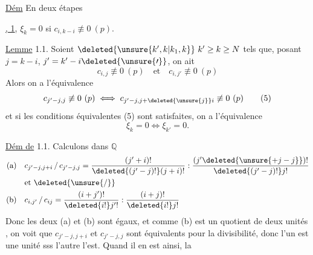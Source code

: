 \uline{Dém} En deux étapes

\uline{, 1}, $\xi_k=0$ si  $c_{i,k-i}\not\equiv0\ (p)$.

\uline{Lemme} 1.1. Soient $\deleted{\unsure{k',k|k_1,k}}\ k'\geq k\geq N$ tels que, posant $j=k-i$, $j'=k'-i\deleted{\unsure{\prime}}$, on ait
\[
c_{i,j}\not\equiv0\ (p)\quad\text{et}\quad c_{i,j'}\not\equiv0\ (p)\tag*{(4)}
\]
Alors on a l'équivalence
\[
c_{j'-j,j}\not\equiv0\ (p)\iff c_{j'-j,j+\deleted{\unsure{j}}i}\not\equiv0\ (p)\tag*{(5)}
\]
et si les conditions équivalentes (5) sont satisfaites, on a l'équivalence
\[
\xi_k=0\iff\xi_{k'}=0.\tag*{(6)}
\]

\uline{Dém de} 1.1. Calculons dans $\mathbb Q$
\[
\begin{aligned}
\text{(a)}\quad &c_{j'-j,j+i}\,/\,c_{j'-j,j}=\frac{(j'+i)!}{\deleted{(j'-j)!}(j+i)!}:\frac{(j'\deleted{\unsure{+j-j}})!}{\deleted{(j'-j)!}j!}\\
&\text{et }\deleted{\unsure{/}}\\
\text{(b)}\quad &c_{i,j'}\,/\,c_{ij}=\frac{(i+j')!}{\deleted{i!}j'!}:\frac{(i+j)!}{\deleted{i!}j!}
\end{aligned}
\]
\deleted{\[
\text{(b)}\quad c_{i,j'}/c_{ij}=\frac{(i+j')!}{i!\,j'!}:\frac{(i+j)!}{i!\,\unsure{j!}}
\]}
Donc les deux  (a) et (b) sont égaux, et comme (b) est un quotient de deux unités  , on voit que $c_{j'-j,j+i}$ et $c_{j'-j,j}$ sont équivalents pour la divisibilité, donc l'un est une unité sss l'autre l'est. Quand il en est ainsi, la

